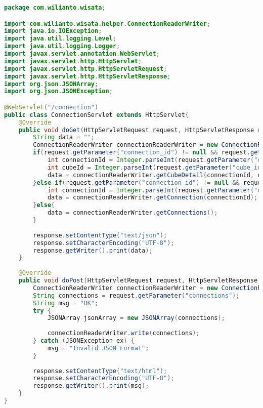 \begin{lstlisting}[language=Java,basicstyle=\tiny,caption=ConnectionServlet.java]
package com.wilianto.wisata;

import com.wilianto.wisata.helper.ConnectionReaderWriter;
import java.io.IOException;
import java.util.logging.Level;
import java.util.logging.Logger;
import javax.servlet.annotation.WebServlet;
import javax.servlet.http.HttpServlet;
import javax.servlet.http.HttpServletRequest;
import javax.servlet.http.HttpServletResponse;
import org.json.JSONArray;
import org.json.JSONException;

@WebServlet("/connection")
public class ConnectionServlet extends HttpServlet{
    @Override
    public void doGet(HttpServletRequest request, HttpServletResponse response) throws IOException{
        String data = "";
        ConnectionReaderWriter connectionReaderWriter = new ConnectionReaderWriter(getServletContext());
        if(request.getParameter("connection_id") != null && request.getParameter("cube_id") != null){
            int connectionId = Integer.parseInt(request.getParameter("connection_id"));
            int cubeId = Integer.parseInt(request.getParameter("cube_id"));
            data = connectionReaderWriter.getCubeDetail(connectionId, cubeId);
        }else if(request.getParameter("connection_id") != null && request.getParameter("cube_id") == null){
            int connectionId = Integer.parseInt(request.getParameter("connection_id"));
            data = connectionReaderWriter.getConnection(connectionId);
        }else{
            data = connectionReaderWriter.getConnections();
        }
        
        response.setContentType("text/json");
        response.setCharacterEncoding("UTF-8");
        response.getWriter().print(data);
    }
    
    @Override
    public void doPost(HttpServletRequest request, HttpServletResponse response) throws IOException{
        ConnectionReaderWriter connectionReaderWriter = new ConnectionReaderWriter(getServletContext());
        String connections = request.getParameter("connections");
        String msg = "OK";
        try {
            JSONArray jsonArray = new JSONArray(connections);
            
            connectionReaderWriter.write(connections);
        } catch (JSONException ex) {
            msg = "Invalid JSON Format";
        }
        
        response.setContentType("text/html");
        response.setCharacterEncoding("UTF-8");
        response.getWriter().print(msg);
    }
}
\end{lstlisting}
